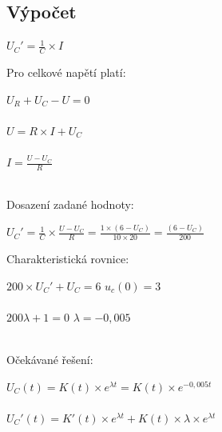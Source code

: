 \documentclass[12pt,a4paper,titlepage,final]{article}
\begin{document}

	\subsection*{Výpočet}
	
	\begin{tabbing}
		${ \displaystyle U_{C}' = \frac{1}{C} \times I }$ \\
	\end{tabbing}
	
	Pro celkové napětí platí:
	
	\begin{tabbing}
		$U_{R} + U_{C} - U = 0$ \\
		\\
		$U = R \times I + U_{C}$ \\
		\\
		${ \displaystyle I = \frac{U - U_{C}}{R} }$ \\
		\\
	\end{tabbing}
	
	Dosazení zadané hodnoty:
	
	\begin{tabbing}
		${ \displaystyle U_{C}' = 
		\frac{1}{C} \times \frac{U - U_{C}}{R} =
		\frac{1 \times (6 - U_{C})}{10 \times 20} =
		\frac{(6 - U_{C})}{200}
		}$ \\
	\end{tabbing}
	
	Charakteristická rovnice:
	
	\begin{tabbing}
		$ 200 \times U_{C}' + U_{C} = 6$ \qquad $u_{c}(0) = 3$ \\
		\\
		$ 200 \lambda + 1 = 0$ \qquad \qquad \quad $\lambda = -0,005$\\
		\\
	\end{tabbing}
	
	Očekávané řešení:
	
	\begin{tabbing}
		$ U_{C}(t) = K (t) \times e^{ \lambda t} = K (t) \times e^{-0,005t} $\\
		\\
		$U_{C}' (t) = K' (t) \times e^{ \lambda t} +
		              K (t) \times \lambda \times e^{ \lambda t }$ \\
		\\
	\end{tabbing}
	
\end{document}

